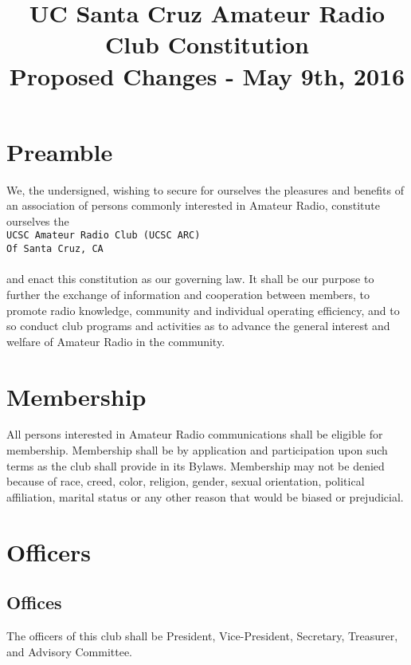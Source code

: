\documentclass{article}
\begin{document}
\title{UC Santa Cruz Amateur Radio Club Constitution \\ \small{Proposed Changes - May 9th, 2016}}
\author{}
\date{}
\maketitle

\tableofcontents

\pagebreak

\section{Preamble}
We, the undersigned, wishing to secure for ourselves the pleasures and benefits of an association of persons commonly interested in Amateur Radio, constitute ourselves the\\

\indent \texttt{UCSC Amateur Radio Club (UCSC ARC)\\ \indent Of Santa Cruz, CA}\\ \\
and enact this constitution as our governing law. It shall be our purpose to further the exchange of information and cooperation between members, to promote radio knowledge, community and individual operating efficiency, and to so conduct club programs and activities as to advance the general interest and welfare of Amateur Radio in the community. 

\section{Membership}
All persons interested in Amateur Radio communications shall be eligible for membership. Membership shall be by application and participation upon such terms as the club shall provide in its Bylaws. Membership may not be denied because of race, creed, color, religion, gender, sexual orientation, political affiliation, marital status or any other reason that would be biased or prejudicial.
\section{Officers}

\subsection{Offices}

The officers of this club shall be President, Vice-President, Secretary, Treasurer, and Advisory Committee.
\end{document}
